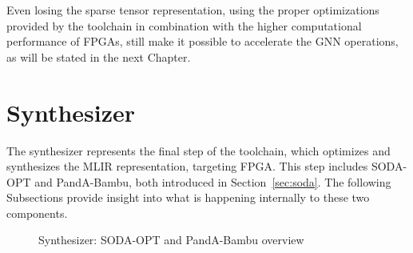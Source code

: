Even losing the sparse tensor representation, using the proper optimizations provided by the toolchain in combination with the higher computational performance of FPGAs, still make it possible to accelerate the GNN operations, as will be stated in the next Chapter.

\section{Synthesizer}
\label{sec:toolchain-synthesizer}%

The synthesizer represents the final step of the toolchain, which optimizes and synthesizes the MLIR representation, targeting FPGA\@.
This step includes SODA-OPT and PandA-Bambu, both introduced in Section~\ref{sec:soda}.
The following Subsections provide insight into what is happening internally to these two components.

\begin{figure}[t]
    \centering
    \hspace{0.03\textwidth}
    \caption{Synthesizer: SODA-OPT and PandA-Bambu overview~\cite{9786533}}
    \label{fig:synthesizer_flow}
\end{figure}

